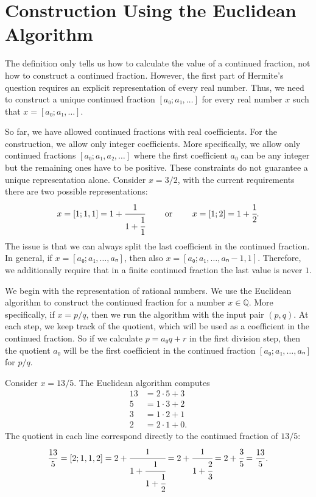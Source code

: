 \section{Construction Using the Euclidean Algorithm}
\label{sec:cf-construction}

The definition only tells us how to calculate the value of a continued fraction,
not how to construct a continued fraction.
However, the first part of Hermite's question requires an explicit representation of every real number.
Thus, we need to construct a unique continued fraction $[a₀; a₁, …]$ for every
real number $x$ such that $x = [a₀; a₁, …]$.

So far, we have allowed continued fractions with real coefficients.
For the construction, we allow only integer coefficients.
More specifically, we allow only continued fractions $[a₀; a₁, a₂, …]$
where the first coefficient $a₀$ can be any integer but the remaining ones have to be positive.
These constraints do not guarantee a unique representation alone.
Consider $x = 3/2$, with the current requirements there are two possible representations:
\[
  x = [1; 1, 1] = 1 + \cfrac{1}{1 + \cfrac{1}{1}} \qquad \text{ or } \qquad x = [1; 2] = 1 + \cfrac{1}{2}.
\]
The issue is that we can always split the last coefficient in the continued fraction.
In general, if $x = [a₀; a₁, …, aₙ]$, then also $x = [a₀; a₁, …, aₙ - 1, 1]$.
Therefore, we additionally require that in a finite continued fraction the last value is never $1$.

We begin with the representation of rational numbers.
We use the Euclidean algorithm to construct the continued fraction for a number $x ∈ ℚ$.
More specifically, if $x = p/q$, then we run the algorithm with the input pair $(p, q)$.
At each step, we keep track of the quotient,
which will be used as a coefficient in the continued fraction.
So if we calculate $p = a₀q + r$ in the first division step, then the quotient $a₀$ will be
the first coefficient in the continued fraction $[a₀; a₁, …, aₙ]$ for $p/q$.

\begin{example}
  \label{ex:euclidean-cf}
  Consider $x = 13/5$.
  The Euclidean algorithm computes
  \begin{align*}
    13 & = 2 · 5 + 3 \\
     5 & = 1 · 3 + 2 \\
     3 & = 1 · 2 + 1 \\
     2 & = 2 · 1 + 0.
  \end{align*}
  The quotient in each line correspond directly to the continued fraction of $13/5$:
  \[
    \frac{13}{5}
    = [2; 1, 1, 2]
    = 2 + \cfrac{1}{1 + \cfrac{1}{1 + \cfrac{1}{2}}}
    = 2 + \cfrac{1}{1 + \cfrac{2}{3}}
    = 2 + \cfrac{3}{5}
    = \frac{13}{5}.
  \]
\end{example}

